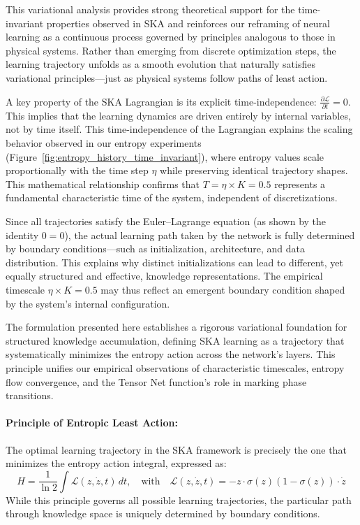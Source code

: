 \documentclass{article}
\begin{document}
This variational analysis provides strong theoretical support for the time-invariant properties observed in SKA and reinforces our reframing of neural learning as a continuous process governed by principles analogous to those in physical systems. Rather than emerging from discrete optimization steps, the learning trajectory unfolds as a smooth evolution that naturally satisfies variational principles—just as physical systems follow paths of least action.

A key property of the SKA Lagrangian is its explicit time-independence: \( \frac{\partial \mathcal{L}}{\partial t} = 0 \). This implies that the learning dynamics are driven entirely by internal variables, not by time itself. This time-independence of the Lagrangian explains the scaling behavior observed in our entropy experiments (Figure~\ref{fig:entropy_history_time_invariant}), where entropy values scale proportionally with the time step $\eta$ while preserving identical trajectory shapes. This mathematical relationship confirms that $T = \eta \times K = 0.5$ represents a fundamental characteristic time of the system, independent of discretizations.

Since all trajectories satisfy the Euler--Lagrange equation (as shown by the identity \( 0 = 0 \)), the actual learning path taken by the network is fully determined by boundary conditions—such as initialization, architecture, and data distribution. This explains why distinct initializations can lead to different, yet equally structured and effective, knowledge representations. The empirical timescale \( \eta \times K = 0.5 \) may thus reflect an emergent boundary condition shaped by the system’s internal configuration.

The formulation presented here establishes a rigorous variational foundation for structured knowledge accumulation, defining SKA learning as a trajectory that systematically minimizes the entropy action across the network’s layers. This principle unifies our empirical observations of characteristic timescales, entropy flow convergence, and the Tensor Net function’s role in marking phase transitions.

\paragraph{Principle of Entropic Least Action:}
The optimal learning trajectory in the SKA framework is precisely the one that minimizes the entropy action integral, expressed as:
	\[
	H = \frac{1}{\ln 2} \int \mathcal{L}(z, \dot{z}, t) \, dt,
	\quad \text{with} \quad
	\mathcal{L}(z, \dot{z}, t) = -z \cdot \sigma(z)(1 - \sigma(z)) \cdot \dot{z}
	\]
While this principle governs all possible learning trajectories, the particular path through knowledge space is uniquely determined by boundary conditions.
	
\end{document}
